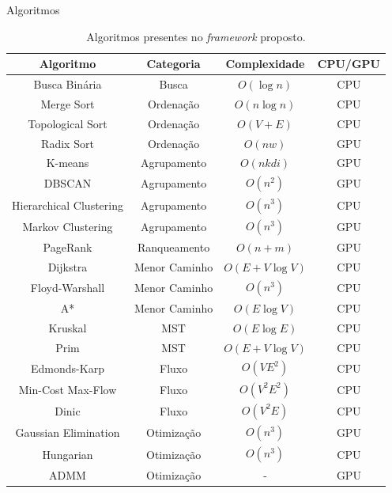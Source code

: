 \begin{frame}{Algoritmos}
    \begin{table}[ht]
        \centering
        \scriptsize
        \begin{tabular}{|c|c|c|c|}
            \hline
            \textbf{Algoritmo} & \textbf{Categoria} & \textbf{Complexidade} & \textbf{CPU/GPU} \\
            \hline
            Busca Binária & Busca & $O(\log n)$ & CPU \\
            \hline
            Merge Sort & Ordenação & $O(n \log n)$ & CPU \\
            \hline
            Topological Sort & Ordenação & $O(V + E)$ & CPU \\
            \hline
            Radix Sort & Ordenação & $O(nw)$ & GPU \\
            \hline
            K-means & Agrupamento & $O(nkdi)$ & GPU \\
            \hline
            DBSCAN & Agrupamento & $O(n^2)$ & GPU \\
            \hline
            Hierarchical Clustering & Agrupamento & $O(n^3)$ & CPU \\
            \hline
            Markov Clustering & Agrupamento & $O(n^3)$ & GPU \\
            \hline
            PageRank & Ranqueamento & $O(n + m)$ & GPU \\
            \hline
            Dijkstra & Menor Caminho & $O(E + V \log V)$ & CPU \\
            \hline
            Floyd-Warshall & Menor Caminho & $O(n^3)$ & CPU \\
            \hline
            A* & Menor Caminho & $O(E \log V)$ & CPU \\
            \hline
            Kruskal & MST & $O(E \log E)$ & CPU \\
            \hline
            Prim & MST & $O(E + V \log V)$ & CPU \\
            \hline
            Edmonds-Karp & Fluxo & $O(VE^2)$ & CPU \\
            \hline
            Min-Cost Max-Flow & Fluxo & $O(V^2E^2)$ & CPU \\
            \hline
            Dinic & Fluxo & $O(V^2E)$ & CPU \\
            \hline
            Gaussian Elimination & Otimização & $O(n^3)$ & GPU \\
            \hline
            Hungarian & Otimização & $O(n^3)$ & CPU \\
            \hline
            ADMM & Otimização & - & GPU \\
            \hline
        \end{tabular}
        \caption{Algoritmos presentes no \textit{framework} proposto.}
        \label{table:algorithms}
    \end{table}
\end{frame}

